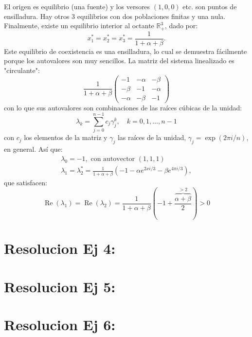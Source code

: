 \documentclass[twocolumn,aps,prl]{revtex4-1}
\begin{document}
El origen es equilibrio (una fuente) y los versores $(1,0,0)$ etc. son puntos de ensilladura. Hay otros 3 equilibrios con dos poblaciones finitas y una nula. Finalmente, existe un equilibrio interior al octante $\mathbb{R}_{+}^{3}$, dado por:
$$
x_{1}^{*}=x_{2}^{*}=x_{3}^{*}=\frac{1}{1+\alpha+\beta} .
$$
Este equilibrio de coexistencia es una ensilladura, lo cual se demuestra fácilmente porque los autovalores son muy sencillos. La matriz del sistema linealizado es "circulante":
$$
\frac{1}{1+\alpha+\beta}\left(\begin{array}{ccc}
-1 & -\alpha & -\beta \\
-\beta & -1 & -\alpha \\
-\alpha & -\beta & -1
\end{array}\right)
$$
con lo que sus autovalores son combinaciones de las raíces cúbicas de la unidad:
$$
\lambda_{k}=\sum_{j=0}^{n-1} c_{j} \gamma_{j}^{k}, \quad k=0,1, \ldots, n-1
$$
con $c_{j}$ los elementos de la matriz y $\gamma_{j}$ las raíces de la unidad, $\gamma_{j}=\exp (2 \pi i / n)$, en general. Así que:
$$
\begin{array}{c}
\lambda_{0}=-1, \text { con autovector }(1,1,1) \\
\lambda_{1}=\lambda_{2}^{*}=\frac{1}{1+\alpha+\beta}\left(-1-\alpha e^{2 x i / 3}-\beta e^{4 \pi i / 3}\right),
\end{array}
$$
que satisfacen:
$$
\operatorname{Re}\left(\lambda_{1}\right)=\operatorname{Re}\left(\lambda_{2}\right)=\frac{1}{1+\alpha+\beta}\left(-1+\frac{\overbrace{\alpha+\beta}^{>2}}{2}\right)>0
$$

% 
%                             
% 

\section{Resolucion Ej 4:}


% 
%                             
% 

\section{Resolucion Ej 5:}

% 
%                              
% 

\section{Resolucion Ej 6:}


\end{document}

